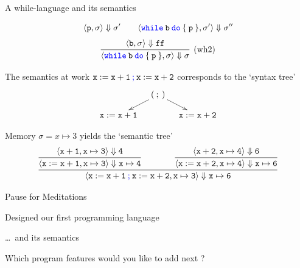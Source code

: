 \documentclass{beamer}
\newcommand{\blue}[1]{\textcolor{blue}{#1}}
\begin{document}
\begin{frame}{A while-language and its semantics}
{\begin{minipage}{1\linewidth}
\[{                        \langle \mathtt{p}, \sigma \rangle \Downarrow \sigma' \qquad
                        \langle \mathtt{\blue{while} \> b \> \blue{do} \> \{ \> p \> \}}, \sigma'
                        \rangle \Downarrow \sigma'' 
                }
        \]\vspace{0.001cm}
        \[
                \infer[(\text{wh2})]{
                        \langle \mathtt{\blue{while} \> b \> \blue{do} \> \{ \> p \> \}}, \sigma \rangle
                        \Downarrow \sigma
                }{
                        \langle \mathtt{b}, \sigma \rangle \Downarrow \mathtt{ff}
                }
        \]
        \end{minipage}
        }
\end{frame}


\begin{frame}{The semantics at work}
        $\mathtt{x := x + 1 \> \blue{;} \> x := x + 2}$ corresponds to the 
        `\alert{syntax} tree'
        \[
                \xymatrix@C=10pt@R=10pt{
                        & (\> ; \>) \ar[dl] \ar[dr]  & \\
                        \mathtt{x := x + 1} & & \mathtt{x := x + 2} 
                }
        \]

        \vspace{0.4cm}
        Memory $\sigma = x \mapsto 3$ yields the `\alert{semantic} tree'
        \[
                \infer{
                        \langle \mathtt{ x := x + 1 \> \blue{;} \> x := x + 2 }, \mathtt{x \mapsto 3}
                        \rangle \Downarrow \mathtt{x \mapsto 6}
                }{
                        \infer{
                                \langle \mathtt{x := x +1}, \mathtt{x \mapsto 3} \rangle 
                                \Downarrow \mathtt{x \mapsto 4}
                        }{
                                \langle \mathtt{x + 1}, \mathtt{x \mapsto 3} \rangle \Downarrow
                                \mathtt{4}
                        }\qquad \qquad                        
                        \infer{
                                \langle \mathtt{x := x + 2}, \mathtt{x \mapsto 4} \rangle 
                                \Downarrow \mathtt{x \mapsto 6}
                        }{
                                \langle \mathtt{x + 2}, \mathtt{x \mapsto 4} \rangle \Downarrow
                                \mathtt{6}
                        }
                }
        \]
\end{frame}

\begin{frame}{Pause for Meditations}

        Designed our first programming language
        
        \dots\ and its \alert{semantics}

        Which program features would you like to add next ? 
        
        \pause
        \bigskip
        \begin{center}
        \end{center}
\end{frame}
\end{document}
